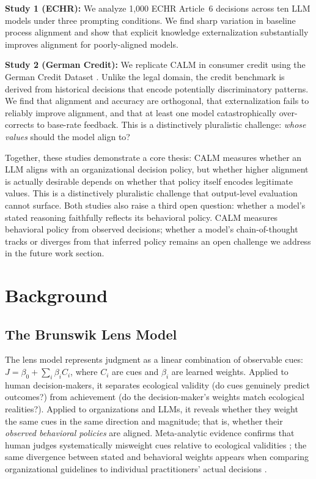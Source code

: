 \documentclass{article}
\begin{document}
\textbf{Study 1 (ECHR):} We analyze 1,000 ECHR Article~6 decisions across ten LLM models under three prompting conditions. We find sharp variation in baseline process alignment and show that explicit knowledge externalization substantially improves alignment for poorly-aligned models.

\textbf{Study 2 (German Credit):} We replicate CALM in consumer credit using the German Credit Dataset \citep{hofmann1994statlog}. Unlike the legal domain, the credit benchmark is derived from historical decisions that encode potentially discriminatory patterns. We find that alignment and accuracy are orthogonal, that externalization fails to reliably improve alignment, and that at least one model catastrophically over-corrects to base-rate feedback. This is a distinctively pluralistic challenge: \emph{whose values} should the model align to?

Together, these studies demonstrate a core thesis: CALM measures whether an LLM aligns with an organizational decision policy, but whether higher alignment is actually desirable depends on whether that policy itself encodes legitimate values. This is a distinctively pluralistic challenge that output-level evaluation cannot surface. Both studies also raise a third open question: whether a model's stated reasoning faithfully reflects its behavioral policy. CALM measures behavioral policy from observed decisions; whether a model's chain-of-thought tracks or diverges from that inferred policy remains an open challenge we address in the future work section.


\section{Background}

\subsection{The Brunswik Lens Model}

The lens model \citep{brunswik1952conceptual,hammond1964psychology} represents judgment as a linear combination of observable cues: $J = \beta_0 + \sum_i \beta_i C_i$, where $C_i$ are cues and $\beta_i$ are learned weights. Applied to human decision-makers, it separates ecological validity (do cues genuinely predict outcomes?) from achievement (do the decision-maker's weights match ecological realities?). Applied to organizations and LLMs, it reveals whether they weight the same cues in the same direction and magnitude; that is, whether their \emph{observed behavioral policies} are aligned. Meta-analytic evidence confirms that human judges systematically misweight cues relative to ecological validities \citep{karelaia2008minds}; the same divergence between stated and behavioral weights appears when comparing organizational guidelines to individual practitioners' actual decisions \citep{smith2003factors}.
\end{document}
